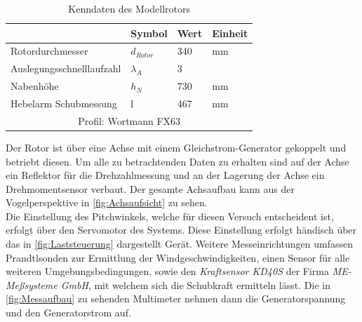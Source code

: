 \begin{table}[H]
    \centering
    \begin{tabular}{llll}
    \hline
                              & Symbol      & Wert & Einheit \\ \hline
    Rotordurchmesser          & $d_{Rotor}$ & 340  & mm      \\
    Auslegungsschnelllaufzahl & $\lambda_A$ & 3    &         \\
    Nabenhöhe                 & $h_N$       & 730  & mm      \\
    Hebelarm Schubmessung     & l           & 467  & mm      \\ \hline
    \multicolumn{4}{c}{Profil: Wortmann FX63}                \\ \hline
    \end{tabular}
    \caption{Kenndaten des Modellrotors}
    \label{tab:Rotorkenndaten}
    \end{table}
Der Rotor ist über eine Achse mit einem Gleichstrom-Generator gekoppelt und betriebt diesen.
Um alle zu betrachtenden Daten zu erhalten sind auf der Achse ein Reflektor für die Drehzahlmessung und an der Lagerung der Achse ein Drehmomentsensor verbaut.
Der gesamte Achsaufbau kann aus der Vogelperspektive in \autoref{fig:Achsaufsicht} zu sehen.\\
Die Einstellung des Pitchwinkels, welche für diesen Versuch entscheident ist, erfolgt über den Servomotor des Systems. Diese Einstellung erfolgt händisch über das in \autoref{fig:Laststeuerung} dargestellt Gerät.
Weitere Messeinrichtungen umfassen Prandtlsonden zur Ermittlung der Windgeschwindigkeiten, einen Sensor für alle weiteren Umgebungsbedingungen, sowie den \textit{Kraftsensor KD40S} der Firma \textit{ME-Meßsysteme GmbH}, mit welchem sich die Schubkraft ermitteln lässt.
Die in \autoref{fig:Messaufbau} zu sehenden Multimeter nehmen dann die Generatorspannung und den Generatorstrom auf.
